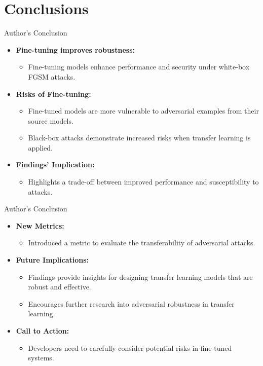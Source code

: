 
\section{Conclusions}

\begin{frame}{Author's Conclusion}
    \begin{itemize}
        \item \textbf{Fine-tuning improves robustness:}
        \begin{itemize}
            \item Fine-tuning models enhance performance and security under white-box FGSM attacks.
        \end{itemize}
        \item \textbf{Risks of Fine-tuning:}
        \begin{itemize}
            \item Fine-tuned models are more vulnerable to adversarial examples from their source models.
            \item Black-box attacks demonstrate increased risks when transfer learning is applied.
        \end{itemize}
        \item \textbf{Findings' Implication:}
        \begin{itemize}
            \item Highlights a trade-off between improved performance and susceptibility to attacks.
        \end{itemize}
    \end{itemize}
\end{frame}

\begin{frame}{Author's Conclusion}
    \begin{itemize}
        \item \textbf{New Metrics:}
        \begin{itemize}
            \item Introduced a metric to evaluate the transferability of adversarial attacks.
        \end{itemize}
        \item \textbf{Future Implications:}
        \begin{itemize}
            \item Findings provide insights for designing transfer learning models that are robust and effective.
            \item Encourages further research into adversarial robustness in transfer learning.
        \end{itemize}
        \item \textbf{Call to Action:}
        \begin{itemize}
            \item Developers need to carefully consider potential risks in fine-tuned systems.
        \end{itemize}
    \end{itemize}
\end{frame}

